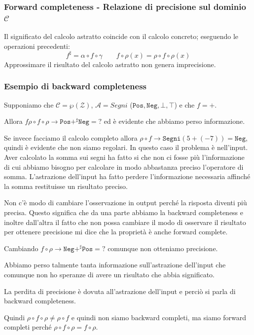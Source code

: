 \subsubsection{Forward completeness - Relazione di precisione sul dominio $\mathcal{C}$}
Il significato del calcolo astratto coincide con il calcolo concreto; eseguendo le operazioni 
precedenti:
\[
    f^\sharp = \alpha \circ f \circ \gamma \qquad f \circ \rho(x) = \rho \circ f \circ \rho(x)
\]
Approssimare il risultato del calcolo astratto non genera imprecisione.
\subsubsection{Esempio di backward completeness}
Supponiamo che $\mathcal{C} = \wp(\mathcal{Z})$, $\mathcal{A} = Segni$ ($\texttt{Pos}, \texttt{Neg},
\bot, \top$) e che $f=+$.

Allora $f \rho \circ f \circ \rho \to \texttt{Pos} +^\sharp \texttt{Neg} = ?$ ed è evidente che abbiamo perso informazione.

Se invece facciamo il calcolo completo allora $\rho \circ f \to \texttt{Segni}(5 + (-7)) = \texttt{Neg}$, quindi 
è evidente che non siamo regolari. In questo caso il problema è nell'input. Aver calcolato la somma 
sui segni ha fatto si che non ci fosse più l'informazione di cui abbiamo bisogno per calcolare
in modo abbastanza preciso l'operatore di somma. L'astrazione dell'input ha fatto perdere 
l'informazione necessaria affinché la somma restituisse un risultato preciso.

Non c'è modo di cambiare l'osservazione in output perché la risposta diventi più precisa. 
Questo significa che da una parte abbiamo la backward completeness e inoltre dall'altra il 
fatto che non possa cambiare il modo di osservare il risultato per ottenere precisione mi dice che la 
proprietà è anche forward complete.

Cambiando $f \circ \rho \to \texttt{Neg} +^\sharp \texttt{Pos} = ?$ comunque non otteniamo
precisione.

Abbiamo perso talmente tanta informazione sull'astrazione dell'input che comunque non 
ho speranze di avere un risultato che abbia significato. 

\begin{tcolorbox}
    La perdita di precisione è dovuta all'astrazione dell'input e perciò si parla di
    backward completeness.
\end{tcolorbox}

\begin{tcolorbox}
    Quindi $\rho \circ f \circ \rho \not= \rho \circ f $ e quindi non siamo backward completi, ma 
    siamo forward completi perché $\rho \circ f \circ \rho = f \circ \rho$.
\end{tcolorbox}
